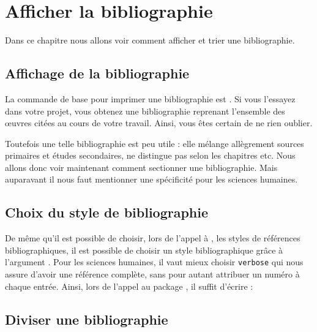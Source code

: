 \chapter{Afficher la bibliographie}

\begin{prealable}

Dans ce chapitre nous allons voir comment afficher et trier une bibliographie.
\end{prealable}


\section{Affichage de la bibliographie}

La commande de base  pour imprimer une bibliographie est . Si vous l'essayez dans votre projet, vous obtenez une bibliographie reprenant l'ensemble des œuvres  citées au cours de votre travail. Ainsi, vous êtes certain de ne rien oublier.

Toutefois une telle bibliographie est peu utile : elle mélange allègrement sources primaires et études secondaires, ne distingue pas selon les chapitres etc. Nous allons donc voir maintenant comment sectionner une bibliographie. Mais auparavant il nous faut mentionner une spécificité pour les sciences humaines.



\section{Choix du style de bibliographie}

De même qu'il est possible de choisir, lors de l'appel à , les styles de références bibliographiques, il est possible de choisir un style bibliographique grâce à l'argument . Pour les sciences humaines, il vaut mieux choisir \verb|verbose| qui nous assure d'avoir une référence complète, sans pour autant attribuer un numéro à chaque entrée.
Ainsi, lors de l'appel au package , il suffit d'écrire :

\begin{latexcode}
\usepackage[bibstyle=verbose,...]{biblatex}
\end{latexcode}

\section{Diviser une bibliographie}

